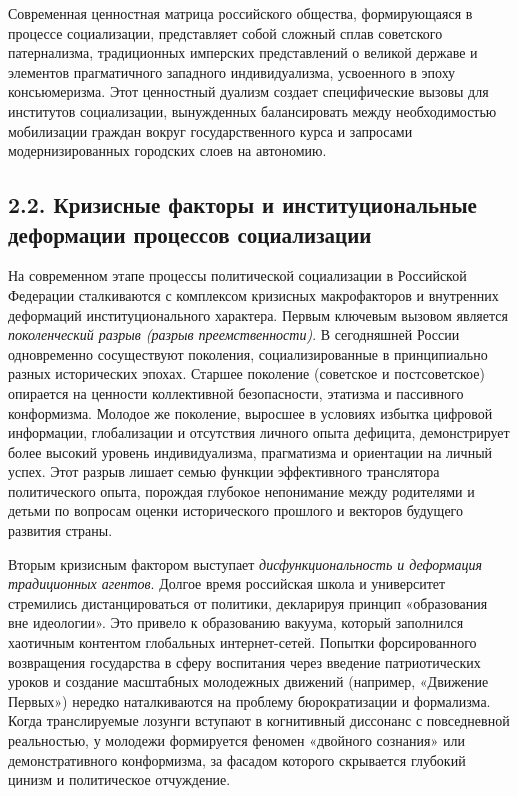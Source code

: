 Современная ценностная матрица российского общества, формирующаяся в процессе социализации, представляет собой сложный сплав советского патернализма, традиционных имперских представлений о великой державе и элементов прагматичного западного индивидуализма, усвоенного в эпоху консьюмеризма. Этот ценностный дуализм создает специфические вызовы для институтов социализации, вынужденных балансировать между необходимостью мобилизации граждан вокруг государственного курса и запросами модернизированных городских слоев на автономию.

\subsection{2.2. Кризисные факторы и институциональные деформации процессов социализации}

На современном этапе процессы политической социализации в Российской Федерации сталкиваются с комплексом кризисных макрофакторов и внутренних деформаций институционального характера. Первым ключевым вызовом является \textit{поколенческий разрыв (разрыв преемственности)}. В сегодняшней России одновременно сосуществуют поколения, социализированные в принципиально разных исторических эпохах. Старшее поколение (советское и постсоветское) опирается на ценности коллективной безопасности, этатизма и пассивного конформизма. Молодое же поколение, выросшее в условиях избытка цифровой информации, глобализации и отсутствия личного опыта дефицита, демонстрирует более высокий уровень индивидуализма, прагматизма и ориентации на личный успех. Этот разрыв лишает семью функции эффективного транслятора политического опыта, порождая глубокое непонимание между родителями и детьми по вопросам оценки исторического прошлого и векторов будущего развития страны.

Вторым кризисным фактором выступает \textit{дисфункциональность и деформация традиционных агентов}. Долгое время российская школа и университет стремились дистанцироваться от политики, декларируя принцип «образования вне идеологии». Это привело к образованию вакуума, который заполнился хаотичным контентом глобальных интернет-сетей. Попытки форсированного возвращения государства в сферу воспитания через введение патриотических уроков и создание масштабных молодежных движений (например, «Движение Первых») нередко наталкиваются на проблему бюрократизации и формализма. Когда транслируемые лозунги вступают в когнитивный диссонанс с повседневной реальностью, у молодежи формируется феномен «двойного сознания» или демонстративного конформизма, за фасадом которого скрывается глубокий цинизм и политическое отчуждение.

